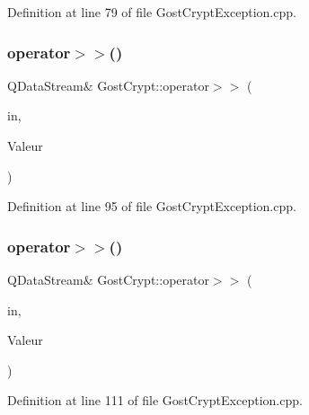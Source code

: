 Definition at line 79 of file Gost\+Crypt\+Exception.\+cpp.

\mbox{\label{namespace_gost_crypt_aba02906a3e43411fed2623eb87901ca6}} 
\subsubsection{\texorpdfstring{operator$>$$>$()}{operator>>()}\hspace{0.1cm}{\footnotesize\ttfamily [5/13]}}
{\footnotesize\ttfamily Q\+Data\+Stream\& Gost\+Crypt\+::operator$>$$>$ (\begin{DoxyParamCaption}\item[{Q\+Data\+Stream \&}]{in,  }\item[{\hyperlink{class_gost_crypt_1_1_failed_flush_file}{Gost\+Crypt\+::\+Failed\+Flush\+File} \&}]{Valeur }\end{DoxyParamCaption})}



Definition at line 95 of file Gost\+Crypt\+Exception.\+cpp.

\mbox{\label{namespace_gost_crypt_ade3d0ececb14827148355792f1b1b45c}} 
\subsubsection{\texorpdfstring{operator$>$$>$()}{operator>>()}\hspace{0.1cm}{\footnotesize\ttfamily [6/13]}}
{\footnotesize\ttfamily Q\+Data\+Stream\& Gost\+Crypt\+::operator$>$$>$ (\begin{DoxyParamCaption}\item[{Q\+Data\+Stream \&}]{in,  }\item[{\hyperlink{class_gost_crypt_1_1_failed_lseek_file}{Gost\+Crypt\+::\+Failed\+Lseek\+File} \&}]{Valeur }\end{DoxyParamCaption})}



Definition at line 111 of file Gost\+Crypt\+Exception.\+cpp.

\mbox{\label{namespace_gost_crypt_adaf523e4f87259058da16649dfd6df12}} 
